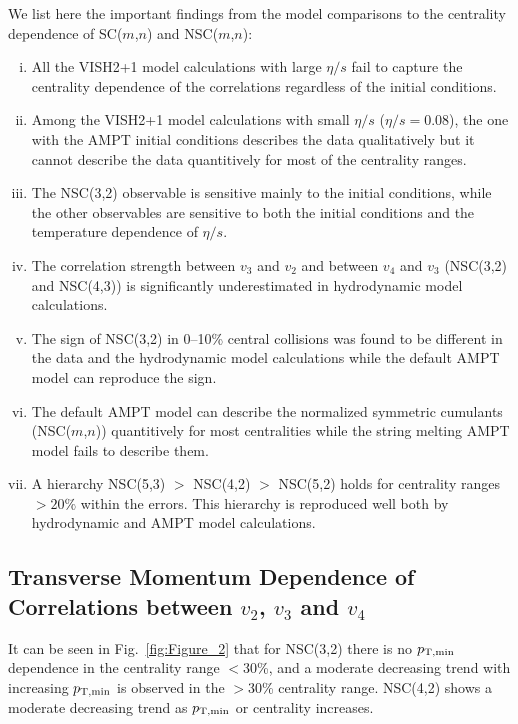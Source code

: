 We list here the important findings from the model comparisons to the centrality dependence of SC($m$,$n$) and NSC($m$,$n$):
\begin{enumerate}[(i)]
	\item All the VISH2+1 model calculations with large $\eta/s$ fail to capture the centrality dependence of the correlations regardless of the initial conditions.
	\item Among the VISH2+1 model calculations with small $\eta/s$ ($\eta/s=0.08$), the one with the AMPT initial conditions describes the data qualitatively but it cannot describe the data quantitively for most of the centrality ranges.
	\item The NSC(3,2) observable is sensitive mainly to the initial conditions, while the other observables are sensitive to both the initial conditions and the temperature dependence of $\eta/s$.
	\item The correlation strength between $v_3$ and $v_2$ and between $v_4$ and $v_3$ (NSC(3,2) and NSC(4,3)) is significantly underestimated in hydrodynamic model calculations.
	\item The sign of NSC(3,2) in 0--10\% central collisions was found to be different in the data and the hydrodynamic model calculations while the default AMPT model can reproduce the sign.
	\item The default AMPT model can describe the normalized symmetric cumulants (NSC($m$,$n$)) quantitively for most centralities while the string melting AMPT model fails to describe them.
	\item A hierarchy NSC(5,3) $>$ NSC(4,2) $>$ NSC(5,2) holds for centrality ranges $>20\%$ within the errors. This hierarchy is reproduced well both by hydrodynamic and AMPT model calculations.

\end{enumerate}


\subsection{Transverse Momentum Dependence of Correlations between $v_2$, $v_3$ and $v_4$}
\label{sec:ptdepsc}

It can be seen in Fig.~\ref{fig:Figure_2} that for NSC(3,2) there is no $p_{\rm T, min}$ dependence in the centrality range $<$30\%, and a moderate decreasing trend with increasing $p_{\rm T, min}$ is observed in the $>$30\% centrality range.
NSC(4,2) shows a moderate decreasing trend as $p_{\rm T, min}$ or centrality increases. 

